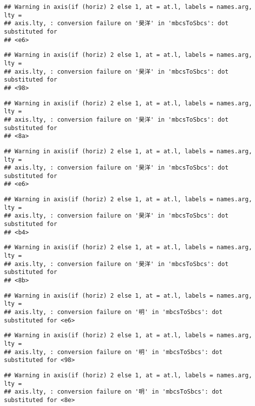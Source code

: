 \documentclass[
]{article}
\begin{document}
\begin{verbatim}
## Warning in axis(if (horiz) 2 else 1, at = at.l, labels = names.arg, lty =
## axis.lty, : conversion failure on '昊洋' in 'mbcsToSbcs': dot substituted for
## <e6>
\end{verbatim}

\begin{verbatim}
## Warning in axis(if (horiz) 2 else 1, at = at.l, labels = names.arg, lty =
## axis.lty, : conversion failure on '昊洋' in 'mbcsToSbcs': dot substituted for
## <98>
\end{verbatim}

\begin{verbatim}
## Warning in axis(if (horiz) 2 else 1, at = at.l, labels = names.arg, lty =
## axis.lty, : conversion failure on '昊洋' in 'mbcsToSbcs': dot substituted for
## <8a>
\end{verbatim}

\begin{verbatim}
## Warning in axis(if (horiz) 2 else 1, at = at.l, labels = names.arg, lty =
## axis.lty, : conversion failure on '昊洋' in 'mbcsToSbcs': dot substituted for
## <e6>
\end{verbatim}

\begin{verbatim}
## Warning in axis(if (horiz) 2 else 1, at = at.l, labels = names.arg, lty =
## axis.lty, : conversion failure on '昊洋' in 'mbcsToSbcs': dot substituted for
## <b4>
\end{verbatim}

\begin{verbatim}
## Warning in axis(if (horiz) 2 else 1, at = at.l, labels = names.arg, lty =
## axis.lty, : conversion failure on '昊洋' in 'mbcsToSbcs': dot substituted for
## <8b>
\end{verbatim}

\begin{verbatim}
## Warning in axis(if (horiz) 2 else 1, at = at.l, labels = names.arg, lty =
## axis.lty, : conversion failure on '明' in 'mbcsToSbcs': dot substituted for <e6>
\end{verbatim}

\begin{verbatim}
## Warning in axis(if (horiz) 2 else 1, at = at.l, labels = names.arg, lty =
## axis.lty, : conversion failure on '明' in 'mbcsToSbcs': dot substituted for <98>
\end{verbatim}

\begin{verbatim}
## Warning in axis(if (horiz) 2 else 1, at = at.l, labels = names.arg, lty =
## axis.lty, : conversion failure on '明' in 'mbcsToSbcs': dot substituted for <8e>
\end{verbatim}
\end{document}
